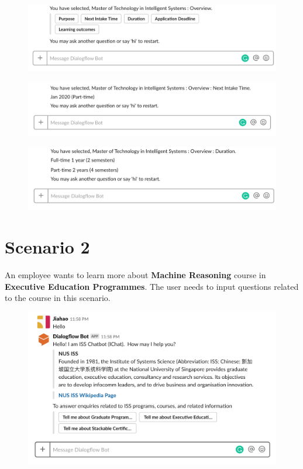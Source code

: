 		\begin{figure}[H]
			\centering
			\includegraphics[width=\linewidth, frame]{img/scenario_4.png}
		\end{figure}

		\begin{figure}[H]
			\centering
			\includegraphics[width=\linewidth, frame]{img/scenario_5.png}
		\end{figure}

		\begin{figure}[H]
			\centering
			\includegraphics[width=\linewidth, frame]{img/scenario_6.png}
		\end{figure}

	\section{Scenario 2} %
	\label{sec:scenario_2}
		An employee wants to learn more about \textbf{Machine Reasoning} course in \textbf{Executive Education Programmes}. The user needs to input questions related to the course in this scenario.

		\begin{figure}[H]
			\centering
			\includegraphics[width=\linewidth, frame]{img/scenario_2_1.png}
		\end{figure}

